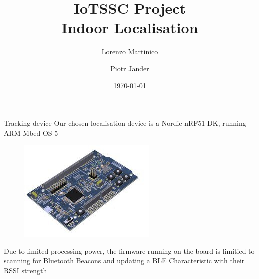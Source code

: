 \documentclass[landscape]{infslides}
\begin{document}
\title[IoTSSC Project]{IoTSSC Project\\Indoor Localisation}
\author[Lorenzo Martinico and Piotr Jander]{Lorenzo Martinico \and Piotr Jander}
\date{\today}

\maketitle
\begin{slide}{Tracking device}
    Our chosen localisation device is a Nordic nRF51-DK, running ARM Mbed OS 5
    \begin{figure}
        \centering
        \includegraphics{nRF51-DK.jpg}
    \end{figure}
    Due to limited processing power, the firmware running on the board is limitied to scanning for Bluetooth Beacons and updating a BLE Characteristic with their RSSI strength
\end{slide}
\end{document}
